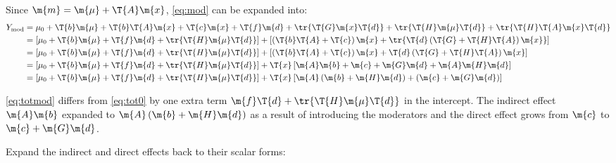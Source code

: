 Since $\m{m} = \m{\mu} + \T{A}\m{x}$, \cref{eq:mod} can be expanded into:
\begin{equation}\label{eq:totmod}
    \begin{aligned}
        Y_\text{mod} &= \mu_0 + \T{b}\m{\mu} + \T{b}\T{A}\m{x} + \T{c}\m{x} + \T{f}\m{d} + \tr{\T{G}\m{x}\T{d}} + \tr{\T{H}\m{\mu}\T{d}} + \tr{\T{H}\T{A}\m{x}\T{d}}\\
        &= \left[ \mu_0 + \T{b}\m{\mu} + \T{f}\m{d} + \tr{\T{H}\m{\mu}\T{d}} \right] + \left[ \left( \T{b}\T{A} + \T{c} \right) \m{x} + \tr{\T{d}\left( \T{G} + \T{H}\T{A} \right) \m{x}} \right]\\
        &= \left[ \mu_0 + \T{b}\m{\mu} + \T{f}\m{d} + \tr{\T{H}\m{\mu}\T{d}} \right] + \left[ \left( \T{b}\T{A} + \T{c} \right) \m{x} + \T{d}\left( \T{G} + \T{H}\T{A} \right) \m{x} \right]\\
        &= \left[ \mu_0 + \T{b}\m{\mu} + \T{f}\m{d} + \tr{\T{H}\m{\mu}\T{d}} \right] + \T{x} \left[ \m{A}\m{b} + \m{c} + \m{G}\m{d} + \m{A}\m{H}\m{d} \right]\\
        &= \left[ \mu_0 + \T{b}\m{\mu} + \T{f}\m{d} + \tr{\T{H}\m{\mu}\T{d}} \right] + \T{x} \left[ \m{A} \left( \m{b} + \m{H}\m{d} \right) + \left( \m{c} + \m{G}\m{d} \right) \right]
    \end{aligned}
\end{equation}

\cref{eq:totmod} differs from \cref{eq:tot0} by one extra term $\m{f}\T{d} + \tr{\T{H}\m{\mu}\T{d}}$ in the intercept. The indirect effect $\m{A}\m{b}$ expanded to $\m{A} \left( \m{b} + \m{H}\m{d} \right)$ as a result of introducing the moderators and the direct effect grows from $\m{c}$ to $\m{c} + \m{G}\m{d}$.

\newpage

Expand the indirect and direct effects back to their scalar forms:

